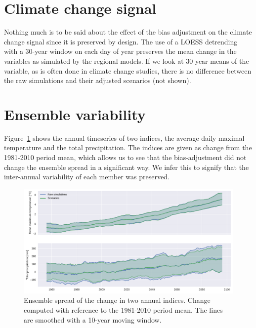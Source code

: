 \documentclass[letterpaper,10pt]{article}
\begin{document}
\section{Climate change signal}
Nothing much is to be said about the effect of the bias adjustment on the climate change signal since it is preserved by design.
The use of a LOESS detrending with a 30-year window on each day of year preserves the mean change in the variables as simulated by the regional models.
If we look at 30-year means of the variable, as is often done in climate change studies, there is no difference between the raw simulations and their adjusted scenarios (not shown).

\section{Ensemble variability}
Figure~\ref{fig:ensvar} shows the annual timeseries of two indices, the average daily maximal temperature and the total precipitation.
The indices are given as change from the 1981-2010 period mean, which allows us to see that the bias-adjustment did not change the ensemble spread in a significant way.
We infer this to signify that the inter-annual variability of each member was preserved.

\begin{figure}
\centering
\includegraphics[width=\textwidth]{../images/ensemble_variability.pdf}
\caption{Ensemble spread of the change in two annual indices. Change computed with reference to the 1981-2010 period mean. The lines are smoothed with a 10-year moving window.}\label{fig:ensvar}
\end{figure}
\end{document}
